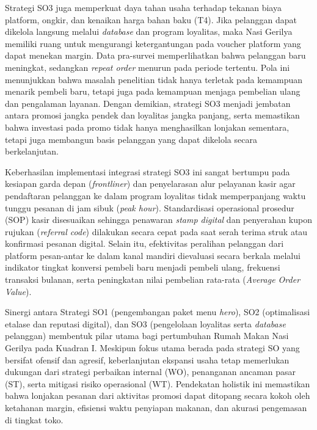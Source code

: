 Strategi SO3 juga memperkuat daya tahan usaha terhadap tekanan biaya platform, ongkir, dan kenaikan harga bahan baku (T4). Jika pelanggan dapat dikelola langsung melalui \textit{database} dan program loyalitas, maka Nasi Gerilya memiliki ruang untuk mengurangi ketergantungan pada voucher platform yang dapat menekan margin. Data pra-survei memperlihatkan bahwa pelanggan baru meningkat, sedangkan \textit{repeat order} menurun pada periode tertentu. Pola ini menunjukkan bahwa masalah penelitian tidak hanya terletak pada kemampuan menarik pembeli baru, tetapi juga pada kemampuan menjaga pembelian ulang dan pengalaman layanan. Dengan demikian, strategi SO3 menjadi jembatan antara promosi jangka pendek dan loyalitas jangka panjang, serta memastikan bahwa investasi pada promo tidak hanya menghasilkan lonjakan sementara, tetapi juga membangun basis pelanggan yang dapat dikelola secara berkelanjutan.

Keberhasilan implementasi integrasi strategi SO3 ini sangat bertumpu pada kesiapan garda depan (\textit{frontliner}) dan penyelarasan alur pelayanan kasir agar pendaftaran pelanggan ke dalam program loyalitas tidak memperpanjang waktu tunggu pesanan di jam sibuk (\textit{peak hour}). Standardisasi operasional prosedur (SOP) kasir disesuaikan sehingga penawaran \textit{stamp digital} dan penyerahan kupon rujukan (\textit{referral code}) dilakukan secara cepat pada saat serah terima struk atau konfirmasi pesanan digital. Selain itu, efektivitas peralihan pelanggan dari platform pesan-antar ke dalam kanal mandiri dievaluasi secara berkala melalui indikator tingkat konversi pembeli baru menjadi pembeli ulang, frekuensi transaksi bulanan, serta peningkatan nilai pembelian rata-rata (\textit{Average Order Value}).

Sinergi antara Strategi SO1 (pengembangan paket menu \textit{hero}), SO2 (optimalisasi etalase dan reputasi digital), dan SO3 (pengelolaan loyalitas serta \textit{database} pelanggan) membentuk pilar utama bagi pertumbuhan Rumah Makan Nasi Gerilya pada Kuadran I. Meskipun fokus utama berada pada strategi SO yang bersifat ofensif dan agresif, keberlanjutan ekspansi usaha tetap memerlukan dukungan dari strategi perbaikan internal (WO), penanganan ancaman pasar (ST), serta mitigasi risiko operasional (WT). Pendekatan holistik ini memastikan bahwa lonjakan pesanan dari aktivitas promosi dapat ditopang secara kokoh oleh ketahanan margin, efisiensi waktu penyiapan makanan, dan akurasi pengemasan di tingkat toko.

